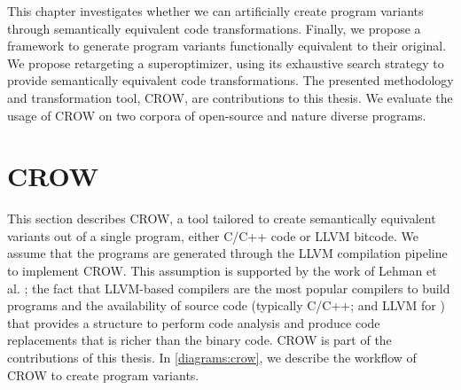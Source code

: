 

\label{chapter:generation}

\newcommand{\libsodiumfunctions}{687}
\newcommand{\qrcodefunctions}{1840}

\newcommand{\diversifiedsodium}{89}
\newcommand{\diversifiedqrcode}{130}
\newcommand{\libpopulation}{2408}
\newcommand{\qrpopulation}{4155}

\newcommand{\py}[1]{}

\newcommand{\allmewefunctions}{\libsodiumfunctions + \qrcodefunctions}
\newcommand{\allmewediversified}{\diversifiedsodium + \diversifiedqrcode}
\newcommand{\allmewepopulation}{\libpopulation + \qrpopulation}



This chapter investigates whether we can artificially create program variants through semantically equivalent code transformations. Finally, we propose a framework to generate program variants functionally equivalent to their original.
We propose retargeting a superoptimizer, using its exhaustive search strategy to provide semantically equivalent code transformations. 
The presented methodology and transformation tool, CROW, are contributions to this thesis.
We evaluate the usage of CROW on two corpora of open-source and nature diverse programs. 



\section{CROW}
\label{section:crow}
This section describes CROW, a tool tailored to create semantically equivalent variants out of a single program, either C/C++ code or LLVM bitcode. We assume that the \wasm programs are generated through the LLVM compilation pipeline to implement CROW. This assumption is supported by the work of Lehman et al. \cite{}; the fact that LLVM-based compilers are the most popular compilers to build \wasm programs \cite{usenixWASM2020} and the availability of source code (typically C/C++; and LLVM for \wasm) that provides a structure to perform code analysis and produce code replacements that is richer than the binary code. CROW is part of the contributions of this thesis.
In \autoref{diagrams:crow}, we describe the workflow of CROW to create program variants.

